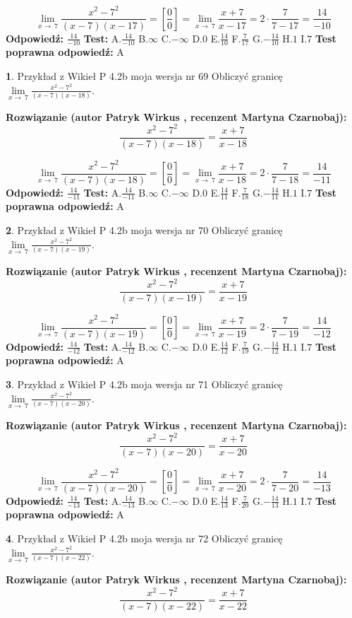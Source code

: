 \documentclass[12pt, a4paper]{article}
\theoremstyle{definition} %
\newtheorem{zad}{}
\newcommand{\zadStart}[1]{\begin{zad}#1\newline}
\newcommand{\zadStop}{\end{zad}}
\newcommand{\rozwStart}[2]{\noindent \textbf{Rozwiązanie (autor #1 , recenzent #2): }\newline}
\newcommand{\rozwStop}{\newline}
\newcommand{\odpStart}{\noindent \textbf{Odpowiedź:}\newline}
\newcommand{\odpStop}{\newline}
\newcommand{\testStart}{\noindent \textbf{Test:}\newline}
\newcommand{\testStop}{\newline}
\newcommand{\kluczStart}{\noindent \textbf{Test poprawna odpowiedź:}\newline}
\newcommand{\kluczStop}{\newline}
\begin{document}
$$\lim\limits_{x\to\ 7}\frac{x^{2}-7^{2}}{(x-7)(x-17)}=[\frac{0}{0}]=\lim\limits_{x\to\ 7}\frac{x+7}{x-17}=2 \cdot \frac{7}{7-17} = \frac{14}{-10}$$
\rozwStop
\odpStart
$\frac{14}{-10}$
\odpStop
\testStart
A.$\frac{14}{-10}$
B.$\infty$
C.$-\infty$
D.$0$
E.$\frac{14}{10}$
F.$\frac{7}{17}$
G.$-\frac{14}{10}$
H.$1$
I.$7$
\testStop
\kluczStart
A
\kluczStop



\zadStart{Przykład z Wikieł P 4.2b moja wersja nr 69}
Obliczyć granicę $\lim\limits_{x\to\ 7}\frac{x^{2}-7^{2}}{(x-7)(x-18)}$.
\zadStop
\rozwStart{Patryk Wirkus}{Martyna Czarnobaj}
$$\frac{x^{2}-7^{2}}{(x-7)(x-18)}=\frac{x+7}{x-18}$$

$$\lim\limits_{x\to\ 7}\frac{x^{2}-7^{2}}{(x-7)(x-18)}=[\frac{0}{0}]=\lim\limits_{x\to\ 7}\frac{x+7}{x-18}=2 \cdot \frac{7}{7-18} = \frac{14}{-11}$$
\rozwStop
\odpStart
$\frac{14}{-11}$
\odpStop
\testStart
A.$\frac{14}{-11}$
B.$\infty$
C.$-\infty$
D.$0$
E.$\frac{14}{11}$
F.$\frac{7}{18}$
G.$-\frac{14}{11}$
H.$1$
I.$7$
\testStop
\kluczStart
A
\kluczStop



\zadStart{Przykład z Wikieł P 4.2b moja wersja nr 70}
Obliczyć granicę $\lim\limits_{x\to\ 7}\frac{x^{2}-7^{2}}{(x-7)(x-19)}$.
\zadStop
\rozwStart{Patryk Wirkus}{Martyna Czarnobaj}
$$\frac{x^{2}-7^{2}}{(x-7)(x-19)}=\frac{x+7}{x-19}$$

$$\lim\limits_{x\to\ 7}\frac{x^{2}-7^{2}}{(x-7)(x-19)}=[\frac{0}{0}]=\lim\limits_{x\to\ 7}\frac{x+7}{x-19}=2 \cdot \frac{7}{7-19} = \frac{14}{-12}$$
\rozwStop
\odpStart
$\frac{14}{-12}$
\odpStop
\testStart
A.$\frac{14}{-12}$
B.$\infty$
C.$-\infty$
D.$0$
E.$\frac{14}{12}$
F.$\frac{7}{19}$
G.$-\frac{14}{12}$
H.$1$
I.$7$
\testStop
\kluczStart
A
\kluczStop



\zadStart{Przykład z Wikieł P 4.2b moja wersja nr 71}
Obliczyć granicę $\lim\limits_{x\to\ 7}\frac{x^{2}-7^{2}}{(x-7)(x-20)}$.
\zadStop
\rozwStart{Patryk Wirkus}{Martyna Czarnobaj}
$$\frac{x^{2}-7^{2}}{(x-7)(x-20)}=\frac{x+7}{x-20}$$

$$\lim\limits_{x\to\ 7}\frac{x^{2}-7^{2}}{(x-7)(x-20)}=[\frac{0}{0}]=\lim\limits_{x\to\ 7}\frac{x+7}{x-20}=2 \cdot \frac{7}{7-20} = \frac{14}{-13}$$
\rozwStop
\odpStart
$\frac{14}{-13}$
\odpStop
\testStart
A.$\frac{14}{-13}$
B.$\infty$
C.$-\infty$
D.$0$
E.$\frac{14}{13}$
F.$\frac{7}{20}$
G.$-\frac{14}{13}$
H.$1$
I.$7$
\testStop
\kluczStart
A
\kluczStop



\zadStart{Przykład z Wikieł P 4.2b moja wersja nr 72}
Obliczyć granicę $\lim\limits_{x\to\ 7}\frac{x^{2}-7^{2}}{(x-7)(x-22)}$.
\zadStop
\rozwStart{Patryk Wirkus}{Martyna Czarnobaj}
$$\frac{x^{2}-7^{2}}{(x-7)(x-22)}=\frac{x+7}{x-22}$$
\end{document}
